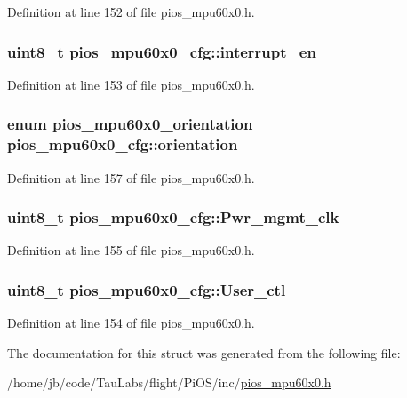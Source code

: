 \-Definition at line 152 of file pios\-\_\-mpu60x0.\-h.

\hypertarget{structpios__mpu60x0__cfg_a34f330d80ad1406663dbe14f1ae362cd}{
\subsubsection[{interrupt\-\_\-en}]{\setlength{\rightskip}{0pt plus 5cm}uint8\-\_\-t {\bf pios\-\_\-mpu60x0\-\_\-cfg\-::interrupt\-\_\-en}}}\label{structpios__mpu60x0__cfg_a34f330d80ad1406663dbe14f1ae362cd}


\-Definition at line 153 of file pios\-\_\-mpu60x0.\-h.

\hypertarget{structpios__mpu60x0__cfg_a43ab1b1e72abc2f1fcf722afefa92dc1}{
\subsubsection[{orientation}]{\setlength{\rightskip}{0pt plus 5cm}enum {\bf pios\-\_\-mpu60x0\-\_\-orientation} {\bf pios\-\_\-mpu60x0\-\_\-cfg\-::orientation}}}\label{structpios__mpu60x0__cfg_a43ab1b1e72abc2f1fcf722afefa92dc1}


\-Definition at line 157 of file pios\-\_\-mpu60x0.\-h.

\hypertarget{structpios__mpu60x0__cfg_ad4ef97a93c0b2cfc7e71652b2ec8c546}{
\subsubsection[{\-Pwr\-\_\-mgmt\-\_\-clk}]{\setlength{\rightskip}{0pt plus 5cm}uint8\-\_\-t {\bf pios\-\_\-mpu60x0\-\_\-cfg\-::\-Pwr\-\_\-mgmt\-\_\-clk}}}\label{structpios__mpu60x0__cfg_ad4ef97a93c0b2cfc7e71652b2ec8c546}


\-Definition at line 155 of file pios\-\_\-mpu60x0.\-h.

\hypertarget{structpios__mpu60x0__cfg_a2fd36500bdaf115a26e2ce8937441a17}{
\subsubsection[{\-User\-\_\-ctl}]{\setlength{\rightskip}{0pt plus 5cm}uint8\-\_\-t {\bf pios\-\_\-mpu60x0\-\_\-cfg\-::\-User\-\_\-ctl}}}\label{structpios__mpu60x0__cfg_a2fd36500bdaf115a26e2ce8937441a17}


\-Definition at line 154 of file pios\-\_\-mpu60x0.\-h.



\-The documentation for this struct was generated from the following file\-:\begin{DoxyCompactItemize}
\item 
/home/jb/code/\-Tau\-Labs/flight/\-Pi\-O\-S/inc/\hyperlink{pios__mpu60x0_8h}{pios\-\_\-mpu60x0.\-h}\end{DoxyCompactItemize}
